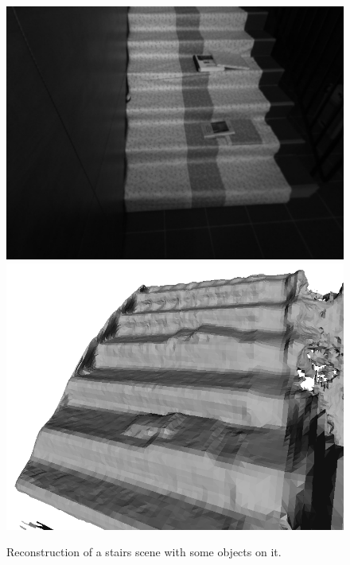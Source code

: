 \begin{figure}[h]
\centering
\includegraphics[scale=0.5]{Chap6-3D-Reconstruction/left0003}
\includegraphics[scale=0.57]{Chap6-3D-Reconstruction/snapshot00}
\caption[]{Reconstruction of a stairs scene with some objects on it.}
\label{Fig:Reconstruction3}
\end{figure}

